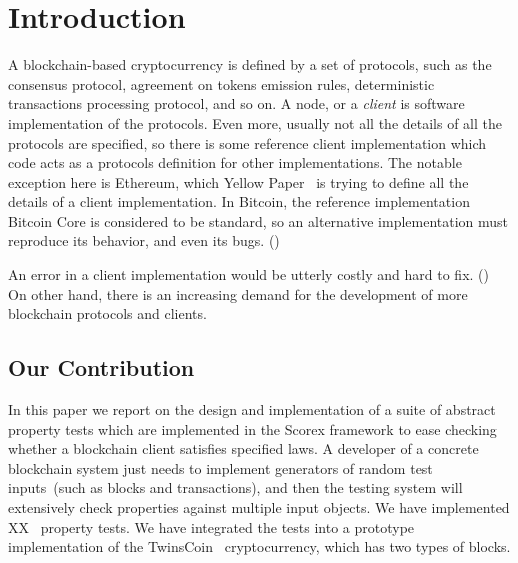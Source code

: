 
\section{Introduction}

A blockchain-based cryptocurrency is defined by a set of protocols, such as the consensus protocol, agreement on tokens emission rules, deterministic transactions processing protocol, and so on. A node, or a {\em client} is software implementation of the protocols. Even more, usually not all the details of all the protocols are specified, so there is some reference client implementation which code acts as a protocols definition for other implementations. The notable exception here is Ethereum, which Yellow Paper~\cite{ethyp} is trying to define all the details of a client implementation. In Bitcoin, the reference implementation Bitcoin Core is considered to be standard, so an alternative implementation must reproduce its behavior, and even its bugs. ()

An error in a client implementation would be utterly costly and hard to fix. () On other hand, there is an increasing demand for the development of more blockchain protocols and clients. 


\subsection{Our Contribution}

In this paper we report on the design and implementation of a suite of abstract property tests which are implemented in the Scorex framework to ease checking whether a blockchain client satisfies specified laws. A developer of a concrete blockchain system just needs to implement generators of random test inputs~(such as blocks and transactions), and then the testing system will extensively check properties against multiple input objects. We have implemented XX~ property tests. We have integrated the tests into a prototype implementation of the TwinsCoin~ cryptocurrency, which has two types of blocks.  

